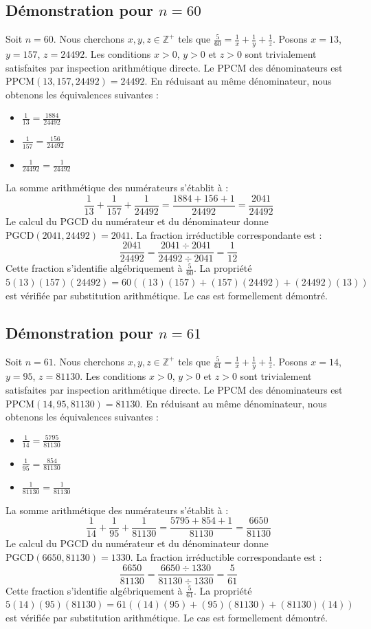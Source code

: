\documentclass[12pt,a4paper]{article}
\begin{document}
\subsection{Démonstration pour $n = 60$}
Soit $n = 60$. Nous cherchons $x, y, z \in \mathbb{Z}^{+}$ tels que $\frac{5}{60} = \frac{1}{x} + \frac{1}{y} + \frac{1}{z}$.
Posons $x = 13$, $y = 157$, $z = 24492$.
Les conditions $x > 0$, $y > 0$ et $z > 0$ sont trivialement satisfaites par inspection arithmétique directe.
Le PPCM des dénominateurs est $\text{PPCM}(13, 157, 24492) = 24492$.
En réduisant au même dénominateur, nous obtenons les équivalences suivantes :
\begin{itemize}
    \item $\frac{1}{13} = \frac{1884}{24492}$
    \item $\frac{1}{157} = \frac{156}{24492}$
    \item $\frac{1}{24492} = \frac{1}{24492}$
\end{itemize}
La somme arithmétique des numérateurs s'établit à :
$$ \frac{1}{13} + \frac{1}{157} + \frac{1}{24492} = \frac{1884 + 156 + 1}{24492} = \frac{2041}{24492} $$
Le calcul du PGCD du numérateur et du dénominateur donne $\text{PGCD}(2041, 24492) = 2041$.
La fraction irréductible correspondante est :
$$ \frac{2041}{24492} = \frac{2041 \div 2041}{24492 \div 2041} = \frac{1}{12} $$
Cette fraction s'identifie algébriquement à $\frac{5}{60}$.
La propriété $5(13)(157)(24492) = 60((13)(157) + (157)(24492) + (24492)(13))$ est vérifiée par substitution arithmétique.
Le cas est formellement démontré.

\subsection{Démonstration pour $n = 61$}
Soit $n = 61$. Nous cherchons $x, y, z \in \mathbb{Z}^{+}$ tels que $\frac{5}{61} = \frac{1}{x} + \frac{1}{y} + \frac{1}{z}$.
Posons $x = 14$, $y = 95$, $z = 81130$.
Les conditions $x > 0$, $y > 0$ et $z > 0$ sont trivialement satisfaites par inspection arithmétique directe.
Le PPCM des dénominateurs est $\text{PPCM}(14, 95, 81130) = 81130$.
En réduisant au même dénominateur, nous obtenons les équivalences suivantes :
\begin{itemize}
    \item $\frac{1}{14} = \frac{5795}{81130}$
    \item $\frac{1}{95} = \frac{854}{81130}$
    \item $\frac{1}{81130} = \frac{1}{81130}$
\end{itemize}
La somme arithmétique des numérateurs s'établit à :
$$ \frac{1}{14} + \frac{1}{95} + \frac{1}{81130} = \frac{5795 + 854 + 1}{81130} = \frac{6650}{81130} $$
Le calcul du PGCD du numérateur et du dénominateur donne $\text{PGCD}(6650, 81130) = 1330$.
La fraction irréductible correspondante est :
$$ \frac{6650}{81130} = \frac{6650 \div 1330}{81130 \div 1330} = \frac{5}{61} $$
Cette fraction s'identifie algébriquement à $\frac{5}{61}$.
La propriété $5(14)(95)(81130) = 61((14)(95) + (95)(81130) + (81130)(14))$ est vérifiée par substitution arithmétique.
Le cas est formellement démontré.
\end{document}
